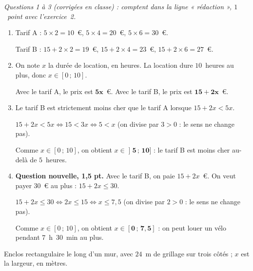 \documentclass[11pt,a4paper]{article}
\newcommand{\exercice}[1]{%
  \vspace{0.5em}
  \noindent\exobox{Exercice #1}\par
  \vspace{0.6em}
}
\newcommand{\res}[1]{\ensuremath{\mathbf{#1}}}
\begin{document}
\smallskip
\textit{Questions 1 à 3 (corrigées en classe) : comptent dans la ligne « rédaction », $1$~point avec l'exercice~2.}
\begin{enumerate}
	\item Tarif A : $5\times 2=10$~€, $5\times 4=20$~€, $5\times 6=30$~€.

	Tarif B : $15+2\times 2=19$~€, $15+2\times 4=23$~€, $15+2\times 6=27$~€.
	\item On note $x$ la durée de location, en heures. La location dure $10$~heures au plus, donc $x\in[0\,;\,10]$.

	Avec le tarif A, le prix est \res{5x}~€. Avec le tarif B, le prix est \res{15+2x}~€.
	\item Le tarif B est strictement moins cher que le tarif A lorsque $15+2x<5x$.

	$15+2x<5x \iff 15<3x \iff 5<x$ \quad (on divise par $3>0$ : le sens ne change pas).

	Comme $x\in[0\,;\,10]$, on obtient $x\in\res{\mathopen{]}5\,;\,10]}$ : le tarif B est moins cher au-delà de $5$~heures.
	\item {\color{titrebleu}\bfseries Question nouvelle, 1,5 pt.} Avec le tarif B, on paie $15+2x$~€. On veut payer $30$~€ au plus : $15+2x\leqslant 30$.

	$15+2x\leqslant 30 \iff 2x\leqslant 15 \iff x\leqslant 7{,}5$ \quad (on divise par $2>0$ : le sens ne change pas).

	Comme $x\in[0\,;\,10]$, on obtient $x\in\res{[0\,;\,7{,}5]}$ : on peut louer un vélo pendant $7$~h~$30$~min au plus.
\end{enumerate}

\exercice{2}
Enclos rectangulaire le long d'un mur, avec $24$~m de grillage sur trois côtés ; $x$ est la largeur, en mètres.
\end{document}
